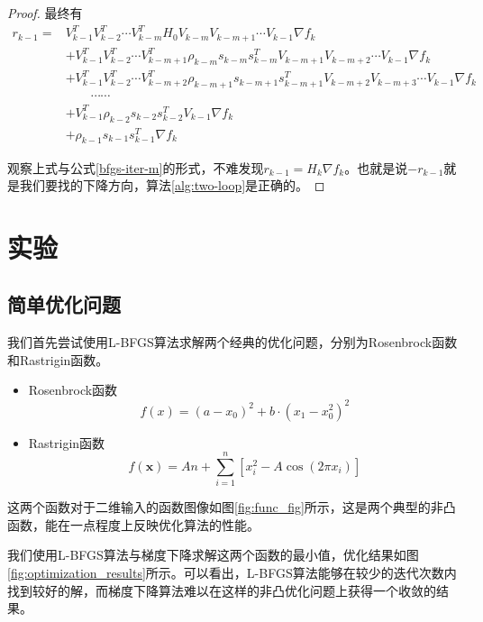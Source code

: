 \documentclass{article}
\begin{document}
\begin{proof}
    最终有
    \begin{align*}
        r_{k-1}
        =& V_{k-1}^TV_{k-2}^T\cdots V_{k-m}^TH_0V_{k-m}V_{k-m+1}\cdots V_{k-1}\nabla f_k\\
        &+V_{k-1}^TV_{k-2}^T\cdots V_{k-m+1}^T\rho_{k-m}s_{k-m}s_{k-m}^TV_{k-m+1}V_{k-m+2}\cdots V_{k-1}\nabla f_k\\
        &+V_{k-1}^TV_{k-2}^T\cdots V_{k-m+2}^T\rho_{k-m+1}s_{k-m+1}s_{k-m+1}^TV_{k-m+2}V_{k-m+3}\cdots V_{k-1}\nabla f_k\\
        &\quad\quad\cdots\cdots\\
        &+V_{k-1}^T\rho_{k-2}s_{k-2}s_{k-2}^TV_{k-1}\nabla f_k\\
        &+\rho_{k-1}s_{k-1}s_{k-1}^T\nabla f_k
    \end{align*}

    观察上式与公式\ref*{bfgs-iter-m}的形式，不难发现$r_{k-1}=H_k\nabla f_k$。也就是说$-r_{k-1}$就是我们要找的下降方向，算法\ref{alg:two-loop}是正确的。
\end{proof}

\section{实验}

\subsection{简单优化问题}

我们首先尝试使用L-BFGS算法求解两个经典的优化问题，分别为Rosenbrock函数和Rastrigin函数。

\begin{itemize}
    \item Rosenbrock函数
    $$
    f(x) = (a - x_0)^2 + b \cdot (x_1 - x_0^2)^2
    $$
    \item Rastrigin函数
    $$
    f(\mathbf{x}) = An + \sum_{i=1}^{n} \left[ x_i^2 - A \cos(2\pi x_i) \right]
    $$
\end{itemize}

这两个函数对于二维输入的函数图像如图\ref{fig:func_fig}所示，这是两个典型的非凸函数，能在一点程度上反映优化算法的性能。

我们使用L-BFGS算法与梯度下降求解这两个函数的最小值，优化结果如图\ref{fig:optimization_results}所示。可以看出，L-BFGS算法能够在较少的迭代次数内找到较好的解，而梯度下降算法难以在这样的非凸优化问题上获得一个收敛的结果。
\end{document}
